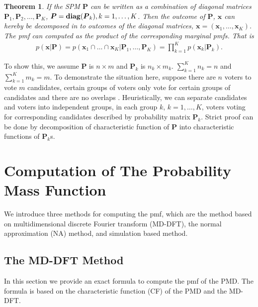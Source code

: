\documentclass[12pt]{article}
\newcommand{\diag}{\textrm{diag}}
\newtheorem{thm}{Theorem}
\begin{document}
\begin{thm}
If the SPM $\boldsymbol{P}$ can be written as a combination of diagonal matrices $\boldsymbol{P}_1, \boldsymbol{P}_2, \dots, \boldsymbol{P}_{K}$, $\boldsymbol{P} = \textbf{\diag}(\boldsymbol{P}_{k}), k=1,\dots,K$. Then the outcome of $\boldsymbol{P}$, $\boldsymbol{x}$ can hereby be decomposed in to  outcomes of the diagonal matrices, $\boldsymbol{x} = (\boldsymbol{x}_{1},\dots,\boldsymbol{x}_{K})$. The pmf can computed as the product of the corresponding marginal pmfs. That is
\begin{align*}
p(\boldsymbol{x}|\boldsymbol{P})= p(\boldsymbol{x}_{1} \cap \dots \cap \boldsymbol{x}_{K}|\boldsymbol{P}_1,\dots,\boldsymbol{P}_{K} )= \prod_{k=1}^K p(\boldsymbol{x}_{k}|\boldsymbol{P}_{k}).
\end{align*}
\end{thm}
To show this, we assume $\boldsymbol{P}$ is $n \times m$ and $\boldsymbol{P}_{k}$ is $n_k \times m_k$. $\sum_{k=1}^K n_k = n$ and $\sum_{k=1}^K m_k = m$. To demonstrate the situation here, suppose there are $n$ voters to vote $m$ candidates, certain groups of voters only vote for certain groups of candidates and there are no overlaps . Heuristically, we can separate candidates and voters into independent groups, in each group $k$, $k = 1,\dots,K$, voters voting for corresponding candidates 
described by probability matrix $\boldsymbol{P}_k$. Strict proof can be done by decomposition of characteristic function of $\boldsymbol{P}$ into characteristic functions of $\boldsymbol{P}_{k}$s.



\section{Computation of The Probability Mass Function}\label{sec:CA.driving.study}
We introduce three methods for computing the pmf, which are the method based on multidimensional discrete Fourier transform (MD-DFT), the normal approximation (NA) method, and simulation based method.

\subsection{The MD-DFT Method}
In this section we provide an exact formula to compute the pmf of the PMD. The formula is based on the characteristic function (CF) of the PMD and the MD-DFT.
\end{document}
